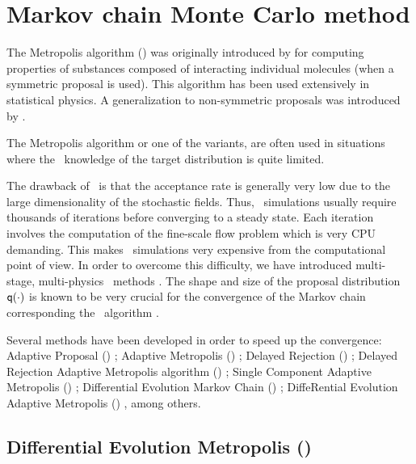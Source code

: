 \section{Markov chain Monte Carlo method \mcmc}

The Metropolis algorithm (\MH) was originally introduced by \cite{metropolis1953} for computing properties of substances
composed of interacting individual molecules (when a symmetric proposal is used).
This algorithm has been used extensively in statistical physics.
A generalization to non-symmetric proposals was introduced by \cite{hastings70}.

The Metropolis algorithm or one of the variants, are often used in situations where the \apriori\ knowledge of the target distribution is quite limited.

The drawback of \mcmc\ is that the acceptance rate is generally very
low due to the large dimensionality of the stochastic fields.
Thus, \mcmc\ simulations usually require thousands of iterations before converging to a steady state. Each iteration involves the computation of the fine-scale flow problem which is very
CPU demanding. This makes \mcmc\ simulations very expensive from the computational point of view. In order to overcome this difficulty, we have introduced multi-stage, multi-physics \mcmc\
methods \citep{ginting11,ginting12,ginting13d}.
The shape and size of the proposal distribution $\mathsf{q}(\cdot)$ is known to be very crucial for the convergence of the Markov chain corresponding the \mcmc\ algorithm \citep{haario99}.

Several methods have been developed in order to speed up the convergence: Adaptive Proposal (\AP) \citep{haario99}; Adaptive Metropolis (\AM) \citep{haario2001}; Delayed Rejection (\DR) \citep{Tierney1994,TierneyMira1999}; Delayed Rejection Adaptive Metropolis algorithm (\DRAM) \citep{Haario2006}; Single Component Adaptive Metropolis (\SCAM) \citep{haario2005}; Differential Evolution  Markov Chain (\DE) \citep{vrugt2003,terbraak2006}; DiffeRential Evolution Adaptive Metropolis (\DREAM) \citep{vrugt2008}, among others.

\subsection{Differential Evolution Metropolis (\DE)}

